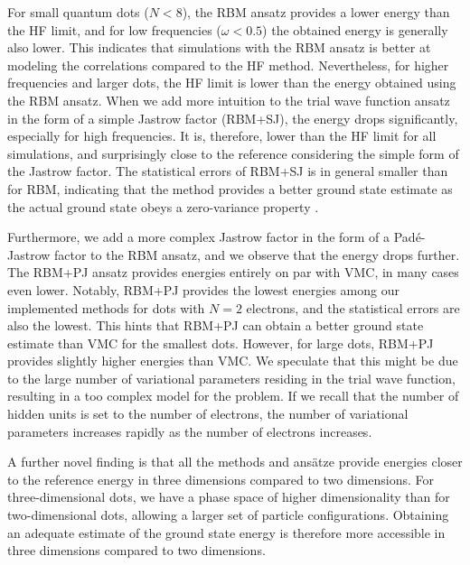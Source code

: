 For small quantum dots ($N<8$), the RBM ansatz provides a lower energy than the HF limit, and for low frequencies ($\omega<0.5$) the obtained energy is generally also lower. This indicates that simulations with the RBM ansatz is better at modeling the correlations compared to the HF method. Nevertheless, for higher frequencies and larger dots, the HF limit is lower than the energy obtained using the RBM ansatz. When we add more intuition to the trial wave function ansatz in the form of a simple Jastrow factor (RBM+SJ), the energy drops significantly, especially for high frequencies. It is, therefore, lower than the HF limit for all simulations, and surprisingly close to the reference considering the simple form of the Jastrow factor. The statistical errors of RBM+SJ is in general smaller than for RBM, indicating that the method provides a better ground state estimate as the actual ground state obeys a zero-variance property \supercite{assaraf_zero-variance_2003}. 

Furthermore, we add a more complex Jastrow factor in the form of a Padé-Jastrow factor to the RBM ansatz, and we observe that the energy drops further. The RBM+PJ ansatz provides energies entirely on par with VMC, in many cases even lower. Notably, RBM+PJ provides the lowest energies among our implemented methods for dots with $N=2$ electrons, and the statistical errors are also the lowest. This hints that RBM+PJ can obtain a better ground state estimate than VMC for the smallest dots. However, for large dots, RBM+PJ provides slightly higher energies than VMC. We speculate that this might be due to the large number of variational parameters residing in the trial wave function, resulting in a too complex model for the problem. If we recall that the number of hidden units is set to the number of electrons, the number of variational parameters increases rapidly as the number of electrons increases. 

A further novel finding is that all the methods and ansätze provide energies closer to the reference energy in three dimensions compared to two dimensions. For three-dimensional dots, we have a phase space of higher dimensionality than for two-dimensional dots, allowing a larger set of particle configurations. Obtaining an adequate estimate of the ground state energy is therefore more accessible in three dimensions compared to two dimensions.

